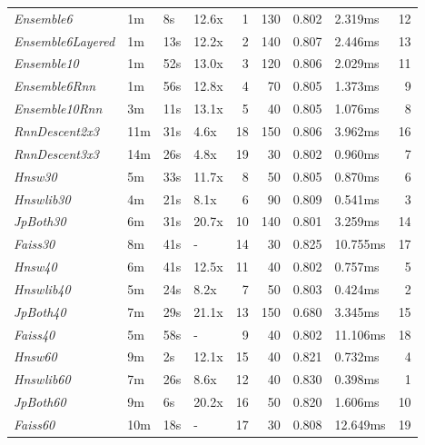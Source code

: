 \begin{tabular}{llllrrrlr}
\toprule
\midrule
\emph{Ensemble6} & 1m & 8s & 12.6x & 1 & 130 & 0.802 & 2.319ms & 12 \\
\emph{Ensemble6Layered} & 1m & 13s & 12.2x & 2 & 140 & 0.807 & 2.446ms & 13 \\
\emph{Ensemble10} & 1m & 52s & 13.0x & 3 & 120 & 0.806 & 2.029ms & 11 \\
\emph{Ensemble6Rnn} & 1m & 56s & 12.8x & 4 & 70 & 0.805 & 1.373ms & 9 \\
\emph{Ensemble10Rnn} & 3m & 11s & 13.1x & 5 & 40 & 0.805 & 1.076ms & 8 \\
\emph{RnnDescent2x3} & 11m & 31s & 4.6x & 18 & 150 & 0.806 & 3.962ms & 16 \\
\emph{RnnDescent3x3} & 14m & 26s & 4.8x & 19 & 30 & 0.802 & 0.960ms & 7 \\
\emph{Hnsw30} & 5m & 33s & 11.7x & 8 & 50 & 0.805 & 0.870ms & 6 \\
\emph{Hnswlib30} & 4m & 21s & 8.1x & 6 & 90 & 0.809 & 0.541ms & 3 \\
\emph{JpBoth30} & 6m & 31s & 20.7x & 10 & 140 & 0.801 & 3.259ms & 14 \\
\emph{Faiss30} & 8m & 41s & - & 14 & 30 & 0.825 & 10.755ms & 17 \\
\emph{Hnsw40} & 6m & 41s & 12.5x & 11 & 40 & 0.802 & 0.757ms & 5 \\
\emph{Hnswlib40} & 5m & 24s & 8.2x & 7 & 50 & 0.803 & 0.424ms & 2 \\
\emph{JpBoth40} & 7m & 29s & 21.1x & 13 & 150 & 0.680 & 3.345ms & 15 \\
\emph{Faiss40} & 5m & 58s & - & 9 & 40 & 0.802 & 11.106ms & 18 \\
\emph{Hnsw60} & 9m & 2s & 12.1x & 15 & 40 & 0.821 & 0.732ms & 4 \\
\emph{Hnswlib60} & 7m & 26s & 8.6x & 12 & 40 & 0.830 & 0.398ms & 1 \\
\emph{JpBoth60} & 9m & 6s & 20.2x & 16 & 50 & 0.820 & 1.606ms & 10 \\
\emph{Faiss60} & 10m & 18s & - & 17 & 30 & 0.808 & 12.649ms & 19 \\
\bottomrule
\end{tabular}
